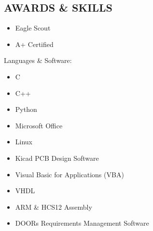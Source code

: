 \documentclass[line,margin]{res}
\begin{document}
\begin{resume}
\section{AWARDS \& SKILLS } 
		\begin{multicols}{2}
			\begin{itemize}
				\itemsep -2pt
				\item[] Eagle Scout
				\item[] A+ Certified

			\end{itemize}
		\end{multicols}
	\vspace{-10pt}
	{Languages \& Software:} %
		\begin{multicols}{2}
			\begin{itemize}
				\itemsep -2pt
				\item[] C
				\item[] C++
				\item[] Python
				\item[] Microsoft Office
				\item[] Linux
				\item[] Kicad PCB Design Software
				\item[] Visual Basic for Applications (VBA)
				\item[] VHDL
				\item[] ARM \& HCS12 Assembly
				\item[] DOORs Requirements Management Software
			\end{itemize}
		\end{multicols}

\end{resume}
\end{document}
